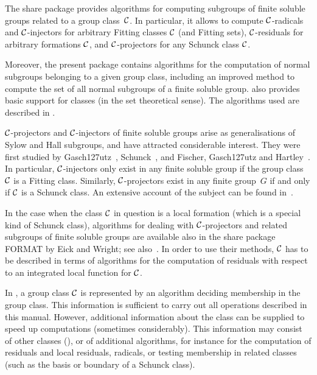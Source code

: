 
%

The share package {\CRISP} provides algorithms for computing subgroups of
finite soluble groups related to a group class~$\cal C$. In particular, it
allows to compute $\cal C$-radicals and $\cal C$-injectors for
arbitrary Fitting classes $\cal C$ (and Fitting sets), $\cal C$-residuals
for arbitrary formations $\cal C$, and $\cal C$-projectors for any Schunck
class $\cal C$.

Moreover, the present package contains algorithms for the computation of
normal subgroups belonging to a given group class, including an improved
method to compute the set of all normal subgroups of a finite soluble
group. {\CRISP} also provides basic support for classes (in
the set theoretical sense). The algorithms used are described in
\cite{HoePP1999a}.

$\cal C$-projectors and $\cal C$-injectors of finite soluble groups
arise as generalisations of Sylow and Hall subgroups, and have attracted
considerable interest. They were first studied
by Gasch\accent127utz~\cite{Ga1963}, Schunck~\cite{Sch1967}, and Fischer,
Gasch\accent127utz and Hartley~\cite{FGH1967}. In particular, $\cal
C$-injectors only exist in any finite soluble group if the group class
$\cal C$ is a Fitting class. Similarly, $\cal C$-projectors exist in any
finite group~$G$ if and only if $\cal C$ is a Schunck class. An extensive
account of the subject can be found in~\cite{DH1992}.

In the case when the class $\cal C$ in question is a local formation (which is
a special kind of Schunck class), algorithms for dealing with $\cal
C$-projectors and related subgroups of finite soluble groups are available
also in the {\GAP} share package FORMAT by Eick and Wright; see
also~\cite{EW1999}. In order to use their methods, $\cal C$ has to be
described in terms of algorithms for the computation of residuals with
respect to an integrated local function for $\cal C$.

In {\CRISP}, a group class $\cal C$ is represented by an algorithm
deciding membership in the group class. This information is sufficient to
carry out all operations described in this manual. However, additional
information about the class can be supplied to speed up computations
(sometimes considerably). This information may consist of other classes
(), or of additional algorithms, for instance for the computation of
residuals and local residuals, radicals, or testing membership in related
classes (such as the basis or boundary of a Schunck class).



